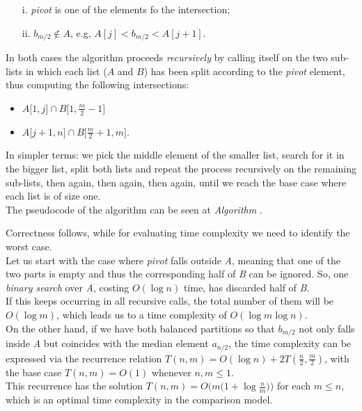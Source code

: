 \begin{itemize}
    \item[i.] \textit{pivot} is one of the elements fo the intersection;
    \item[ii.] $b_{m/2} \notin A$, e.g, $A[j]<b_{m/2}<A[j+1]$.
\end{itemize}

In both cases the algorithm proceeds \textit{recursively} by calling itself on the two sub-lists in which each list ($A$ and $B$) has been split according to the \textit{pivot} element, thus computing the following intersections:

\begin{itemize}
    \item $A\big[1, j\big] \cap B\big[1, \frac{m}{2}-1\big]$
    \item $A\big[ j+1, n\big] \cap B\big[\frac{m}{2}+1, m\big]$.
\end{itemize}

In simpler terms: we pick the middle element of the smaller list, search for it in the bigger list, split both lists and repeat the process recursively on the remaining sub-lists, then again, then again, then again, until we reach the base case where each list is of size one.\\
The pseudocode of the algorithm can be seen at \textit{Algorithm} .

Correctness follows, while for evaluating time complexity we need to identify the worst case. \\
Let us start with the case where \textit{pivot} falls outside \textit{A}, meaning that one of the two parts is empty and thus the corresponding half of \textit{B} can be ignored. So, one \textit{binary search}  over \textit{A}, costing $O(\log n)$ time, has discarded half of \textit{B}.\\
If this keeps occurring in all recursive calls, the total number of them will be $O(\log m)$, which leads us to a time complexity of $O(\log m \log n)$.\\
On the other hand, if we have both balanced partitions so that $b_{m/2}$ not only falls inside \textit{A} but coincides with the median element $a_{n/2}$, the time complexity can be expressed via the recurrence relation $T(n, m) = O(\log n) + 2T \left(\frac{n}{2}, \frac{m}{2}\right)$, with the base case $T(n,m)=O(1)$ whenever $n,m \leq 1$.\\
This recurrence has the solution $T(n,m)=O \big(m \big(1+\log \frac{n}{m}\big)\big)$ for each $m \leq n$, which is an optimal time complexity in the comparison model.

